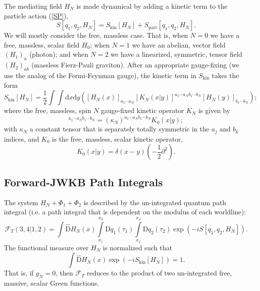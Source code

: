 The mediating field $H_{N}$ is made dynamical by adding a kinetic term to the particle action (\ref{SP}),
\begin{equation}
	S[ q_{1}, q_{2}, H_{N} ] = S_{\text{kin}}[H_{N}] + S_{\text{part}}[ q_{1}, q_{2}, H_{N} ].
\end{equation}
We will mostly consider the free, massless case. That is, when $N = 0$ we have a free, massless, scalar field $H_{0}$; when $N = 1$ we have an abelian, vector field $(H_{1})_{a}$ (photon); and when $N = 2$ we have a linearized, symmetric, tensor field $(H_{2})_{ab}$ (massless Fierz-Pauli graviton). After an appropriate gauge-fixing (we use the analog of the Fermi-Feynman gauge), the kinetic term in $S_{\text{kin}}$ takes the form
\begin{equation}
	S_{\text{kin}}[H_{N}] = \frac{1}{2} \int \int \mathrm{d}x \mathrm{d}y \left( [H_{N}(x)]_{a_{1} \cdots a_{N}} [K_{N}(x|y)]^{a_{1} \cdots a_{N} b_{1} \cdots b_{N}} [H_{N}(y)]_{b_{1} \cdots b_{N}} \right);
\end{equation}
where the free, massless, spin $N$ gauge-fixed kinetic operator $K_{N}$ is given by
\begin{equation}
	[K_{N}(x|y)]^{a_{1} \cdots a_{N} b_{1} \cdots b_{N}} = (\kappa_{N})^{a_{1} \cdots a_{N} b_{1} \cdots b_{N}} K_{0}(x|y);
\end{equation}
with $\kappa_{N}$ a constant tensor that is separately totally symmetric in the $a_{j}$ and $b_{k}$ indices, and $K_{0}$ is the free, massless, scalar kinetic operator,
\begin{equation}
	K_{0}(x|y) = \delta(x - y) \left(- \frac{1}{2} \partial^{2} \right).
\end{equation}
\subsection{Forward-JWKB Path Integrals}
The system $H_{N} + \Phi_{1} + \Phi_{2}$ is described by the un-integrated quantum path integral (i.e. a path integral that is dependent on the modulus of each worldline):
\begin{equation}
	\mathcal{F}_{T}(3, 4|1, 2) = \int \widehat{\mathrm{D}}H_{N}(x) \int\limits_{x_{1}}^{x_{3}} \mathrm{D}q_{1}(\tau_{1}) \int\limits_{x_{2}}^{x_{4}} \mathrm{D}q_{2}(\tau_{2}) \exp{\left( - i S\left[ q_{1}, q_{2}, H_{N} \right] \right)}.
\end{equation}
The functional measure over $H_{N}$ is normalized such that
\begin{equation}
	\int \widehat{\mathrm{D}}H_{N}(x) \exp{\left(- i S_{\text{kin}}[H_{N}] \right)} = 1.
\end{equation}
That is, if $g_{N} = 0$, then $\mathcal{F}_{T}$ reduces to the product of two un-integrated free, massive, scalar Green functions.

